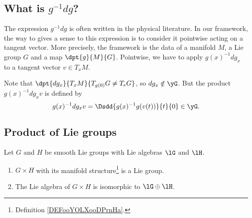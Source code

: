 \subsection{What is  \texorpdfstring{$g^{-1} dg$}{g-1dg}?}\label{SubSecgmudg}

The expression $g^{-1} dg$ is often written in the physical literature. In our framework, the way to gives a sense to this expression is to consider it pointwise acting on a tangent vector. More precisely, the framework is the data of a manifold $M$, a Lie group $G$ and a map $\dpt{g}{M}{G}$. Pointwise, we have to apply $g(x)^{-1} dg_x$ to a tangent vector $v\in T_xM$.

Note that $\dpt{dg_x}{T_xM}{T_{g(0)}G\neq T_eG}$, so $dg_x\notin \yG$. But the product $g(x)^{-1} dg_x v$ is defined by
\begin{equation}
	g(x)^{-1} dg_x v=\Dsdd{ g(x)^{-1} g(v(t)) }{t}{0}\in\yG.
\end{equation}


\subsection{Product of Lie groups}

\begin{proposition}	  \label{PROPooKITOooTcsIiu}
	Let \( G\) and \( H \) be smooth Lie groups with Lie algebras \( \lG\) and \( \lH\).
	\begin{enumerate}
		\item
		      \( G\times H\) with its manifold structure\footnote{Definition \ref{DEFooYOLXooDPrnHa}.} is a Lie group.
		\item
		      The Lie algebra of \( G\times H\) is isomorphic to \( \lG\oplus\lH\).
	\end{enumerate}
\end{proposition}

